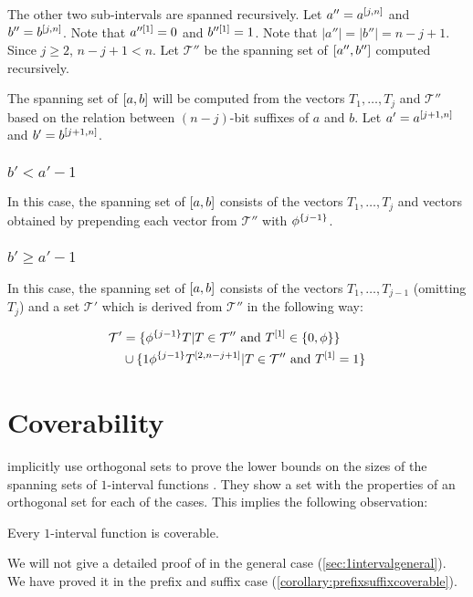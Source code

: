 The other two sub-intervals are spanned recursively.
Let $a'' = a^{[j, n]}$ and $b'' = b^{[j, n]}$.
Note that $a''^{[1]} = 0$ and $b''^{[1]} = 1$.
Note that $|a''| = |b''| = n - j + 1$.
Since $j \geq 2$, $n-j+1 < n$.
Let $\mathcal{T}''$ be the spanning set
of $[a'', b'']$ computed recursively.

The spanning set of $[a, b]$ will be computed
from the vectors $T_1, \ldots, T_j$ and $\mathcal{T}''$
based on the relation between $(n-j)$-bit suffixes of $a$
and $b$.
Let $a' = a^{[j+1, n]}$ and $b' = b^{[j+1, n]}$.

\subsubsection{\texorpdfstring
{$b' < a' - 1$}
{b' < a' - 1}
}

In this case,
the spanning set of $[a, b]$ consists
of the vectors $T_1, \ldots, T_j$ and vectors obtained
by prepending each vector from $\mathcal{T}''$ with
$\phi^{\{j-1\}}$.

\subsubsection{\texorpdfstring
{$b' \geq a' - 1$}
{b' >= a' - 1}
}

In this case,
the spanning set of $[a, b]$ consists
of the vectors $T_1, \ldots, T_{j-1}$ (omitting $T_j$)
and a set $\mathcal{T}'$ which is derived
from $\mathcal{T}''$
in the following way:

\begin{align*}
\mathcal{T}' &= \{
\phi^{\{j-1\}} T | T \in \mathcal{T}'' \text{ and }
T^{[1]} \in \{0, \phi\}
\} \\
&\cup \{
1 \phi^{\{j-1\}} T^{[2, n-j+1]} | T \in \mathcal{T}''
\text{ and } T^{[1]} = 1
\}
\end{align*}


\section{Coverability}

\citeauthor{Schieber2005154} implicitly use
orthogonal sets
to prove the lower bounds on the sizes
of the spanning sets of $1$-interval functions
\citep[Theorem 3]{Schieber2005154}.
They show a set with the properties of an orthogonal set
for each of the cases.
This implies the following observation:
\begin{observation}
\label{observation:1intervalcoverable}
Every $1$-interval function is coverable.
\end{observation}

We will not give a detailed proof of
in the general case (\cref{sec:1intervalgeneral}).
We have proved it in the prefix and suffix case
(\cref{corollary:prefixsuffixcoverable}).
